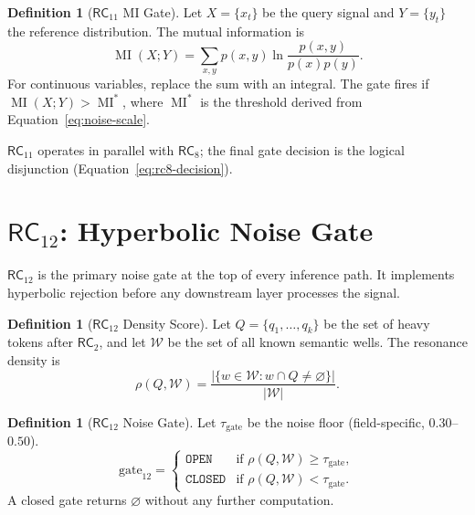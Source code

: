 \documentclass[11pt,twoside]{article}
\theoremstyle{plain}
\theoremstyle{definition}
\newtheorem{definition}[theorem]{Definition}
\theoremstyle{remark}
\DeclareMathOperator{\MI}{MI}
\newcommand{\RC}[1]{\textsf{RC}_{#1}}
\begin{document}
\begin{definition}[$\RC{11}$ MI Gate]
Let $X=\{x_t\}$ be the query signal and $Y=\{y_t\}$ the reference distribution.
The mutual information is
\begin{equation}
  \MI(X;Y) = \sum_{x,y} p(x,y)\ln\frac{p(x,y)}{p(x)p(y)}.
\end{equation}
For continuous variables, replace the sum with an integral.  The gate fires if
$\MI(X;Y)>\MI^*$, where $\MI^*$ is the threshold derived from
Equation~\eqref{eq:noise-scale}.
\end{definition}

\noindent$\RC{11}$ operates in parallel with $\RC{8}$; the final gate decision
is the logical disjunction (Equation~\eqref{eq:rc8-decision}).

\section{\texorpdfstring{$\RC{12}$}{RC12}: Hyperbolic Noise Gate}

$\RC{12}$ is the primary noise gate at the top of every inference path.
It implements hyperbolic rejection before any downstream layer processes the
signal.

\begin{definition}[$\RC{12}$ Density Score]
Let $Q=\{q_1,\ldots,q_k\}$ be the set of heavy tokens after $\RC{2}$, and
let $\mathcal{W}$ be the set of all known semantic wells.  The resonance density is
\begin{equation}\label{eq:density}
  \rho(Q,\mathcal{W}) = \frac{|\{w\in\mathcal{W} : w\cap Q \ne\varnothing\}|}{|\mathcal{W}|}.
\end{equation}
\end{definition}

\begin{definition}[$\RC{12}$ Noise Gate]
Let $\tau_{\mathrm{gate}}$ be the noise floor (field-specific, $0.30$--$0.50$).
\begin{equation}
  \text{gate}_{12} =
  \begin{cases}
    \mathtt{OPEN}   & \text{if } \rho(Q,\mathcal{W}) \ge \tau_{\mathrm{gate}},\\
    \mathtt{CLOSED} & \text{if } \rho(Q,\mathcal{W}) < \tau_{\mathrm{gate}}.
  \end{cases}
\end{equation}
A closed gate returns $\varnothing$ without any further computation.
\end{definition}
\end{document}
